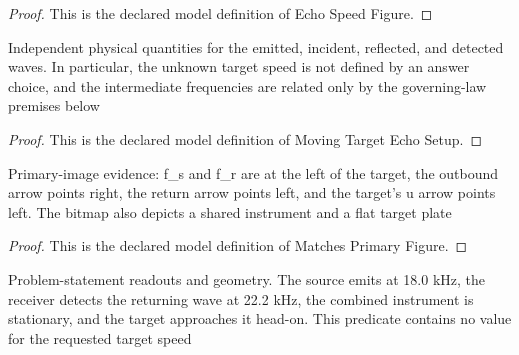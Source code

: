 \begin{proof}
  This is the declared model definition of Echo Speed Figure.
\end{proof}
\begin{definition}
  \label{def:physics:phyx-mini-0327:phyxminiproblems-problemphyxmini0327-movingtargetechosetup}
  Independent physical quantities for the emitted, incident, reflected, and detected waves. In particular, the unknown target speed is not defined by an answer choice, and the intermediate frequencies are related only by the governing-law premises below
\end{definition}
\begin{proof}
  This is the declared model definition of Moving Target Echo Setup.
\end{proof}
\begin{definition}
  \label{def:physics:phyx-mini-0327:phyxminiproblems-problemphyxmini0327-matchesprimaryfigure}
  Primary-image evidence: f\_s and f\_r are at the left of the target, the outbound arrow points right, the return arrow points left, and the target's u arrow points left. The bitmap also depicts a shared instrument and a flat target plate
\end{definition}
\begin{proof}
  This is the declared model definition of Matches Primary Figure.
\end{proof}
\begin{definition}
  \label{def:physics:phyx-mini-0327:phyxminiproblems-problemphyxmini0327-matchesproblemreadouts}
  Problem-statement readouts and geometry. The source emits at 18.0 kHz, the receiver detects the returning wave at 22.2 kHz, the combined instrument is stationary, and the target approaches it head-on. This predicate contains no value for the requested target speed
\end{definition}
